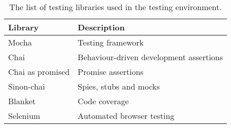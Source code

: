 \begin{table}[H]
\caption[Testing environment]{The list of testing libraries used in the testing environment.}
\label{tab:testing_environment}
\begin{tabularx}{\textwidth}{@{}XX@{}}
	\toprule
	\textbf{Library} & \textbf{Description} \\
	\midrule
	Mocha & Testing framework \\
	Chai & Behaviour-driven development assertions \\
	Chai as promised & Promise assertions \\
	Sinon-chai & Spies, stubs and mocks \\
	Blanket & Code coverage \\
	Selenium & Automated browser testing \\
	\bottomrule
\end{tabularx}
\end{table}